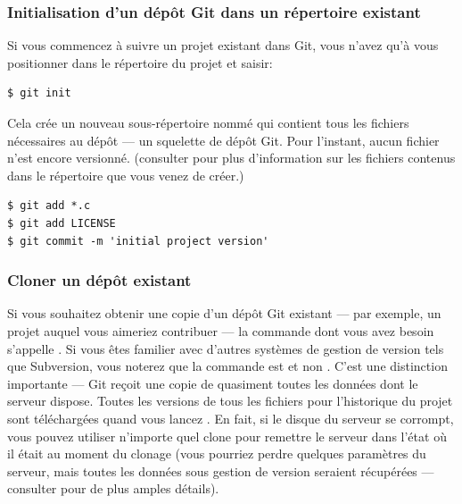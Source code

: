 \subsubsection{Initialisation d'un dépôt Git dans un répertoire existant}

Si vous commencez à suivre un projet existant dans Git, vous n'avez qu'à vous positionner dans le répertoire du projet et saisir:
\begin{Schunk}
\begin{Verbatim}
$ git init
\end{Verbatim}
\end{Schunk}

Cela crée un nouveau sous-répertoire nommé  qui contient tous les fichiers nécessaires au dépôt --- un squelette de dépôt Git.
Pour l'instant, aucun fichier n'est encore versionné.
(consulter  pour plus d'information sur les fichiers contenus dans le répertoire  que vous venez de créer.)
\begin{Schunk}
\begin{Verbatim}
$ git add *.c
$ git add LICENSE
$ git commit -m 'initial project version'
\end{Verbatim}
\end{Schunk}

\subsubsection{Cloner un dépôt existant}
\label{sec:git:cloning}

Si vous souhaitez obtenir une copie d'un dépôt Git existant --- par exemple, un projet auquel vous aimeriez contribuer --- la commande dont vous avez besoin s'appelle .
Si vous êtes familier avec d'autres systèmes de gestion de version tels que Subversion, vous noterez que la commande est  et non .
C'est une distinction importante --- Git reçoit une copie de quasiment toutes les données dont le serveur dispose.
Toutes les versions de tous les fichiers pour l'historique du projet sont téléchargées quand vous lancez .
En fait, si le disque du serveur se corrompt, vous pouvez utiliser n'importe quel clone pour remettre le serveur dans l'état où il était au moment du clonage (vous pourriez perdre quelques paramètres du serveur, mais toutes les données sous gestion de version seraient récupérées --- consulter  pour de plus amples détails).

